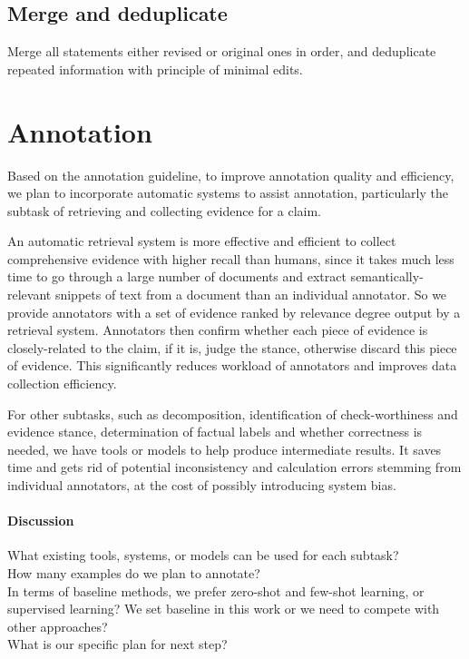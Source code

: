 \documentclass[11pt]{article}
\begin{document}
\subsection{Merge and deduplicate}
Merge all statements either revised or original ones in order, and deduplicate repeated information with principle of minimal edits.


\section{Annotation}
Based on the annotation guideline, to improve annotation quality and efficiency, we plan to incorporate automatic systems to assist annotation, particularly the subtask of retrieving and collecting evidence for a claim.

An automatic retrieval system is more effective and efficient to collect comprehensive evidence with higher recall than humans, since it takes much less time to go through a large number of documents and extract semantically-relevant snippets of text from a document than an individual annotator. 
So we provide annotators with a set of evidence ranked by relevance degree output by a retrieval system.
Annotators then confirm whether each piece of evidence is closely-related to the claim, if it is, judge the stance, otherwise discard this piece of evidence.
This significantly reduces workload of annotators and improves data collection efficiency.

For other subtasks, such as decomposition, identification of check-worthiness and evidence stance, determination of factual labels and whether correctness is needed, we have tools or models to help produce intermediate results.
It saves time and gets rid of potential inconsistency and calculation errors stemming from individual annotators, at the cost of possibly introducing system bias.

\paragraph{Discussion}
What existing tools, systems, or models can be used for each subtask?
\\
How many examples do we plan to annotate?
\\
In terms of baseline methods, we prefer zero-shot and few-shot learning, or supervised learning?
We set baseline in this work or we need to compete with other approaches?
\\
What is our specific plan for next step?







% 


\end{document}
